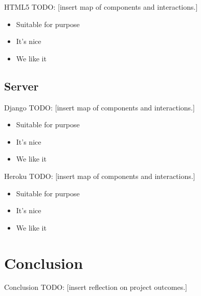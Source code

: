 \documentclass{beamer}
\begin{document}
\begin{frame}{HTML5}
  TODO:
  [insert map of components and interactions.]
  \begin{itemize}
    \item Suitable for purpose
    \item It's nice
    \item We like it
  \end{itemize}
\end{frame}

\subsection{Server}

\begin{frame}{Django}
  TODO:
  [insert map of components and interactions.]
  \begin{itemize}
    \item Suitable for purpose
    \item It's nice
    \item We like it
  \end{itemize}
\end{frame}

\begin{frame}{Heroku}
  TODO:
  [insert map of components and interactions.]
  \begin{itemize}
    \item Suitable for purpose
    \item It's nice
    \item We like it
  \end{itemize}
\end{frame}


\section{Conclusion}

\begin{frame}{Conclusion}
  TODO:
  [insert reflection on project outcomes.]
\end{frame}
\end{document}
